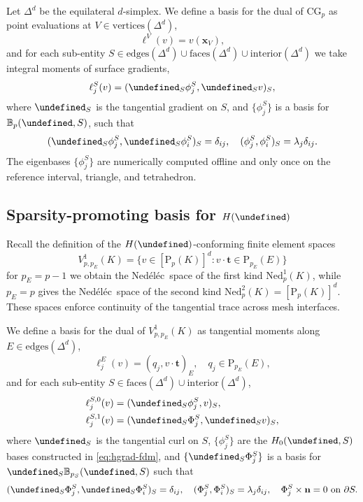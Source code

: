 \documentclass[review,onefignum,onetabnum,a4paper]{siamart190516}
\let\grad\undefined
\let\curl\undefined
\DeclareMathOperator{\grad}{grad}
\DeclareMathOperator{\curl}{curl}
\newcommand{\Hcurl}{H(\curl)}
\renewcommand{\vec}[1]{\mathbf{#1}}
\newcommand{\bn}{\vec{n}}
\newcommand{\bt}{\vec{t}}
\newcommand{\bx}{\vec{x}}
\renewcommand{\P}{\mathrm{P}}
\newcommand{\CG}{\mathrm{CG}}
\newcommand{\Ned}{\mathrm{Ned}^{1}}
\newcommand{\NedTwo}{\mathrm{Ned}^{2}}
\newcommand{\Nedelec}{Ned\'el\'ec~}
\begin{document}
Let $\Delta^d$ be the equilateral $d$-simplex.
We define a basis for the dual of $\CG_p$ as 
point evaluations at $V \in \text{vertices}(\Delta^d)$,
\begin{equation}
   \ell^V(v) = v(\bx_V),
\end{equation}
and for each sub-entity $S \in \text{edges}(\Delta^d) \cup \text{faces}(\Delta^d) \cup \text{interior}(\Delta^d)$
we take integral moments of surface gradients, 
\begin{equation}
   \ell^S_j(v) = (\grad_S\phi^S_j, \grad_S v)_{S},
\end{equation}
where $\grad_S$ is the tangential gradient on $S$,
and $\{\phi^S_j\}$ is a basis for $\mathbb{B}_{p}(\grad, S)$, such that
\begin{equation} \label{eq:hgrad-fdm}
   (\grad_S\phi^S_j, \grad_S\phi^S_i)_{S} = \delta_{ij}, \quad
   (\phi^S_j, \phi^S_i)_{S} = \lambda_j\delta_{ij}.
\end{equation}
The eigenbases $\{\phi^S_j\}$ are numerically computed offline and only once 
on the reference interval, triangle, and tetrahedron.


\subsection{Sparsity-promoting basis for $\Hcurl$}

Recall the definition of the $\Hcurl$-conforming finite element spaces
\begin{equation}
V^1_{p, p_E}(K) = \{v\in [\P_p(K)]^d : v\cdot\bt \in \P_{p_E}(E) \}
\end{equation}
for $p_E=p-1$ we obtain the \Nedelec space of the first kind $\Ned_p(K)$, while
$p_E=p$ gives the \Nedelec space of the second kind $\NedTwo_p(K) = [\P_p(K)]^d$. 
These spaces enforce continuity of the tangential trace across mesh interfaces.


We define a basis for the dual of $V^1_{p, p_E}(K)$ as 
tangential moments along $E\in \text{edges}(\Delta^d)$,
\begin{equation}
   \ell^E_j(v) = (q_j, v\cdot \bt)_E, \quad q_j \in \P_{p_E}(E), 
\end{equation}
and for each sub-entity $S \in \text{faces}(\Delta^d) \cup \text{interior}(\Delta^d)$,
\begin{align}
   \ell^{S,0}_j(v) &= (\grad_S\phi^S_j, v)_{S}, \\
   \ell^{S,1}_j(v) &= (\curl_S\Phi^S_j, \curl_S v)_{S}, \label{eq:hcurl-interior-dofs}
\end{align}
where $\curl_S$ is the tangential curl on $S$,
$\{\phi^S_j\}$ are the $H_0(\grad, S)$ bases constructed in \eqref{eq:hgrad-fdm},
and $\{\curl_S\Phi^S_j\}$ is a basis for $\curl_S \mathbb{B}_{p_S}(\curl, S)$
such that
\begin{equation} \label{eq:hcurl-fdm}
   (\curl_S\Phi^S_j, \curl_S\Phi^S_i)_{S} = \delta_{ij}, \quad
   (\Phi^S_j, \Phi^S_i)_{S} = \lambda_j\delta_{ij}, \quad
   \Phi^S_j\times\bn = 0 \text{ on }\partial S.
\end{equation}
\end{document}
